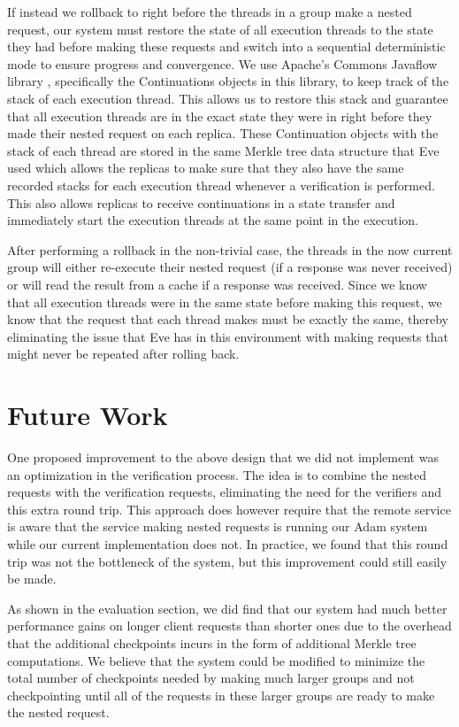 \documentclass[11pt, oneside]{report}
\begin{document}
If instead we rollback to right before the threads in a group make a nested request, our system must restore the state of all execution threads to the state they had before making these requests and switch into a sequential deterministic mode to ensure progress and convergence. 
We use Apache's Commons Javaflow library \cite{javaflow}, specifically the Continuations objects in this library, to keep track of the stack of each execution thread.
This allows us to restore this stack and guarantee that all execution threads are in the exact state they were in right before they made their nested request on each replica. 
These Continuation objects with the stack of each thread are stored in the same Merkle tree data structure that Eve used which allows the replicas to make sure that they also have the same recorded stacks for each execution thread whenever a verification is performed. 
This also allows replicas to receive continuations in a state transfer and immediately start the execution threads at the same point in the execution. 

After performing a rollback in the non-trivial case, the threads in the now current group will either re-execute their nested request (if a response was never received) or will read the result from a cache if a response was received.
Since we know that all execution threads were in the same state before making this request, we know that the request that each thread makes must be exactly the same, thereby eliminating the issue that Eve has in this environment with making requests that might never be repeated after rolling back.

\section{Future Work}

One proposed improvement to the above design that we did not implement was an optimization in the verification process.
The idea is to combine the nested requests with the verification requests, eliminating the need for the verifiers and this extra round trip.
This approach does however require that the remote service is aware that the service making nested requests is running our Adam system while our current implementation does not. 
In practice, we found that this round trip was not the bottleneck of the system, but this improvement could still easily be made.

As shown in the evaluation section, we did find that our system had much better performance gains on longer client requests than shorter ones due to the overhead that the additional checkpoints incurs in the form of additional Merkle tree computations. 
We believe that the system could be modified to minimize the total number of checkpoints needed by making much larger groups and not checkpointing until all of the requests in these larger groups are ready to make the nested request.
\end{document}
